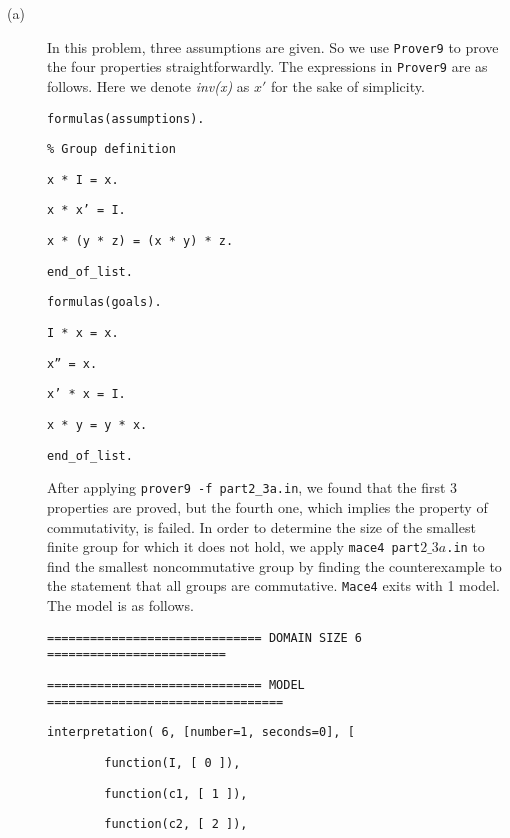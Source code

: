 \begin{description}
  \item[(a)] In this problem, three assumptions are given. So we use {\tt Prover9} to prove the four properties straightforwardly. The expressions in {\tt Prover9} are as follows. Here we denote \emph{inv(x)} as $x'$ for the sake of simplicity.

\vspace{3mm}

{\footnotesize

{\tt formulas(assumptions).}

{\tt \% Group definition}

{\tt x * I = x.}

{\tt x * x' = I.}

{\tt x * (y * z) = (x * y) * z.}

{\tt end\_of\_list.}

{\tt formulas(goals).}

{\tt I * x = x.}

{\tt x'' = x.}

{\tt x' * x = I.}

{\tt x * y = y * x.}

{\tt end\_of\_list.}

}

\vspace{2mm}

  After applying {\tt prover9 -f part2\_3a.in}, we found that the first 3 properties are proved, but the fourth one, which implies the property of commutativity, is failed. In order to determine the size of the smallest finite group for which it does not hold, we apply {\tt mace4 part$2\_3a$.in} to find the smallest noncommutative group by finding the counterexample to the statement that all groups are commutative. {\tt Mace4} exits with 1 model. The model is as follows.

\vspace{3mm}

{\tt ============================== DOMAIN SIZE 6 =========================}

{\tt ============================== MODEL =================================}

{\tt interpretation( 6, [number=1, seconds=0], [}

{\tt \ \ \ \ \ \ \ \ function(I, [ 0 ]),}

{\tt \ \ \ \ \ \ \ \ function(c1, [ 1 ]),}

{\tt \ \ \ \ \ \ \ \ function(c2, [ 2 ]),}


\end{description}
